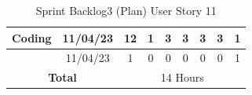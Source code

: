 \documentclass[12pt]{report}
\begin{document}
\begin{table}[h]
{\begin{tabular}{|cc|ccccccc|}
\multicolumn{1}{|c|}{\cellcolor[HTML]{FFFFFF}\textbf{Coding}}                                                     & 11/04/23                                                           & \multicolumn{1}{c|}{\cellcolor[HTML]{FFFFFF}12}                                                                   & \multicolumn{1}{c|}{\cellcolor[HTML]{FFFFFF}1}                                                                  & \multicolumn{1}{c|}{\cellcolor[HTML]{FFFFFF}3}                                                                  & \multicolumn{1}{c|}{\cellcolor[HTML]{FFFFFF}3}                                                                  & \multicolumn{1}{c|}{\cellcolor[HTML]{FFFFFF}3}                                                                  & \multicolumn{1}{c|}{\cellcolor[HTML]{FFFFFF}3}                                                                  & \cellcolor[HTML]{FFFFFF}1                                                                  \\ \hline
\rowcolor[HTML]{FFFFFF} 
\multicolumn{1}{|c|}{\cellcolor[HTML]{FFFFFF}\textbf{Testing}}                                                    & 11/04/23                                                           & \multicolumn{1}{c|}{\cellcolor[HTML]{FFFFFF}1}                                                                    & \multicolumn{1}{c|}{\cellcolor[HTML]{FFFFFF}0}                                                                  & \multicolumn{1}{c|}{\cellcolor[HTML]{FFFFFF}0}                                                                  & \multicolumn{1}{c|}{\cellcolor[HTML]{FFFFFF}0}                                                                  & \multicolumn{1}{c|}{\cellcolor[HTML]{FFFFFF}0}                                                                  & \multicolumn{1}{c|}{\cellcolor[HTML]{FFFFFF}0}                                                                  & \cellcolor[HTML]{FFFFFF}1                                                                  \\ \hline
\multicolumn{2}{|c|}{\textbf{Total}}                                                                                                                                                   & \multicolumn{7}{c|}{14   Hours}                                                                                                                                                                                                                                                                                                                                                                                                                                                                                                                                                                                                                                                                                                                                                                          \\ \hline
\end{tabular}
}
\caption{Sprint Backlog3 (Plan) User Story 11}
\label{tab:mytable}
\end{table}
\end{document}
